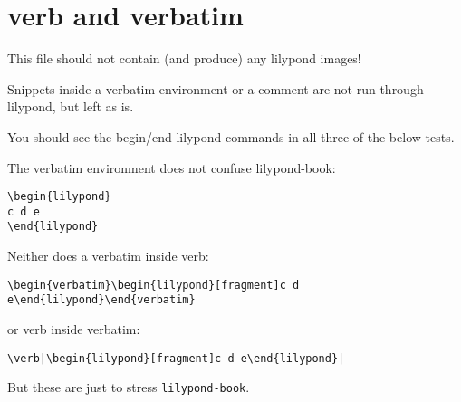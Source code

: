 \documentclass[a4paper, 12pt]{article}
\begin{document}
\section{verb and verbatim}

This file should not contain (and produce) any lilypond images!

Snippets inside a verbatim environment or a comment are not run through
lilypond, but left as is.

You should see the begin/end lilypond commands in all three of the below tests.

%

The verbatim environment does not confuse lilypond-book:

\begin{verbatim}
\begin{lilypond}
c d e
\end{lilypond}
\end{verbatim}




Neither does a verbatim inside verb:

\verb|\begin{verbatim}\begin{lilypond}[fragment]c d e\end{lilypond}\end{verbatim}|

or verb inside verbatim:

\begin{verbatim}
\verb|\begin{lilypond}[fragment]c d e\end{lilypond}|
\end{verbatim}

But these are just to stress \verb|lilypond-book|.
\end{document}
